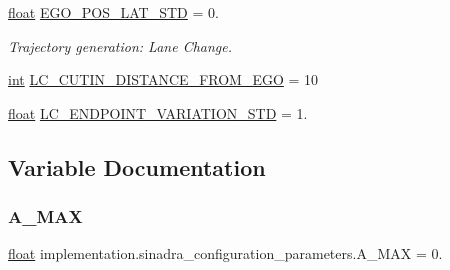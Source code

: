 \begin{DoxyCompactItemize}
\item 
\hyperlink{namespaceimplementation_1_1sinadra__configuration__parameters_a6b4262e47247fcaacec78f8286676cbf}{float} \hyperlink{namespaceimplementation_1_1sinadra__configuration__parameters_ac3a65a5d522b1b2dbde7caa33dcea35e}{E\+G\+O\+\_\+\+P\+O\+S\+\_\+\+L\+A\+T\+\_\+\+S\+TD} = 0.
\begin{DoxyCompactList}\small\item\em Trajectory generation\+: Lane Change. \end{DoxyCompactList}\item 
\hyperlink{namespaceimplementation_1_1sinadra__configuration__parameters_a1053d4f6819fcba166f4cf443ab0123d}{int} \hyperlink{namespaceimplementation_1_1sinadra__configuration__parameters_ae67a4abcfe1bc5cc735ab5d5ae66bb92}{L\+C\+\_\+\+C\+U\+T\+I\+N\+\_\+\+D\+I\+S\+T\+A\+N\+C\+E\+\_\+\+F\+R\+O\+M\+\_\+\+E\+GO} = 10
\item 
\hyperlink{namespaceimplementation_1_1sinadra__configuration__parameters_a6b4262e47247fcaacec78f8286676cbf}{float} \hyperlink{namespaceimplementation_1_1sinadra__configuration__parameters_a00eff0821dfba0fd4eb6fc4881d65869}{L\+C\+\_\+\+E\+N\+D\+P\+O\+I\+N\+T\+\_\+\+V\+A\+R\+I\+A\+T\+I\+O\+N\+\_\+\+S\+TD} = 1.
\end{DoxyCompactItemize}


\subsection{Variable Documentation}
\mbox{\label{namespaceimplementation_1_1sinadra__configuration__parameters_a17b0470a32c5cccc1bbd06778d51f22d}} 
\subsubsection{\texorpdfstring{A\+\_\+\+M\+AX}{A\_MAX}}
{\footnotesize\ttfamily \hyperlink{namespaceimplementation_1_1sinadra__configuration__parameters_a6b4262e47247fcaacec78f8286676cbf}{float} implementation.\+sinadra\+\_\+configuration\+\_\+parameters.\+A\+\_\+\+M\+AX = 0.}

